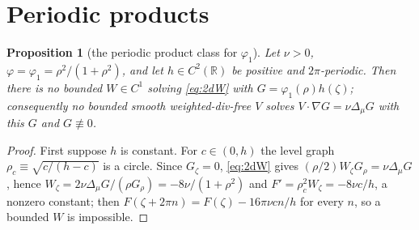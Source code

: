 \documentclass[11pt]{article}
\newtheorem{proposition}[theorem]{Proposition}
\theoremstyle{definition}
\newcommand{\R}{\mathbb{R}}
\begin{document}
\section{Periodic products}
\begin{proposition}[the periodic product class for $\varphi_1$]\label{prop:periodic}
Let $\nu>0$, $\varphi=\varphi_1=\rho^2/(1+\rho^2)$, and let $h\in C^2(\R)$ be
positive and $2\pi$-periodic. Then there is no bounded $W\in C^1$ solving
\eqref{eq:2dW} with $G=\varphi_1(\rho)h(\zeta)$; consequently no bounded smooth
weighted-div-free $V$ solves $V\cdot\nabla G=\nu\Delta_\mu G$ with this $G$ and
$G\not\equiv0$.
\end{proposition}
\begin{proof}
First suppose $h$ is constant. For $c\in(0,h)$ the level graph
$\rho_c\equiv\sqrt{c/(h-c)}$ is a circle. Since $G_\zeta=0$, \eqref{eq:2dW}
gives $(\rho/2)W_\zeta G_\rho=\nu\Delta_\mu G$, hence
$W_\zeta=2\nu\Delta_\mu G/(\rho G_\rho)=-8\nu/(1+\rho^2)$ and
$F'=\rho_c^2W_\zeta=-8\nu c/h$, a nonzero constant; then
$F(\zeta+2\pi n)=F(\zeta)-16\pi\nu c n/h$ for every $n$, so a bounded $W$ is
impossible.


\end{proof}
\end{document}
